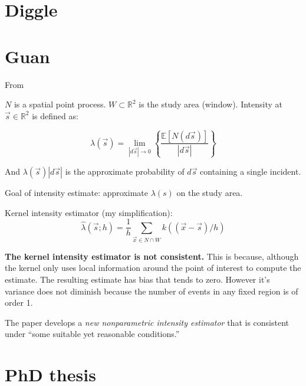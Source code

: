 


\section{Diggle}



\section{Guan}

From \citet{guan2008consistent}

\(N\) is a spatial point process.
\(W \subset \mathbb{R}^2 \) is the study area (window).
Intensity at \(\vec{s} \in \mathbb{R}^2\) is defined as:

\[
    \lambda (\vec{s}) = \lim_{|d\vec{s}| \to 0} \left\{ \frac{\mathbb{E}[N(d\vec{s})]}{|d\vec{s}|} \right\}
\]

And \(\lambda(\vec{s})|d\vec{s}|\) is the approximate probability of \(d\vec{s}\) containing a single incident.

Goal of intensity estimate: approximate \(\lambda(s)\) on the study area.

Kernel intensity estimator (my simplification):
\[
    \hat{\lambda}(\vec{s}; h) = \frac{1}{h} \sum_{\vec{x} \in N \cap W}{k((\vec{x}-\vec{s})/h)}
\]

{
\color{red}
\textbf{The kernel intensity estimator is not consistent.}
This is because, although the kernel only uses local information around the point of interest to compute the estimate.
The resulting estimate has bias that tends to zero.
However it's variance does not diminish because the number of events in any fixed region is of order 1.
}

The paper develops a \textit{new nonparametric intensity estimator} that is consistent under ``some suitable yet reasonable conditions.''

\section{PhD thesis}

